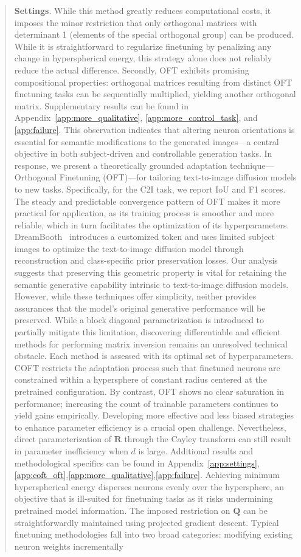 \begin{abstract}
\begin{itemize}[leftmargin=*,nosep]
\textbf{Settings}. While this method greatly reduces computational costs, it imposes the minor restriction that only orthogonal matrices with determinant 1 (elements of the special orthogonal group) can be produced. While it is straightforward to regularize finetuning by penalizing any change in hyperspherical energy, this strategy alone does not reliably reduce the actual difference. Secondly, OFT exhibits promising compositional properties: orthogonal matrices resulting from distinct OFT finetuning tasks can be sequentially multiplied, yielding another orthogonal matrix. Supplementary results can be found in Appendix~\ref{app:more_qualitative}, \ref{app:more_control_task}, and \ref{app:failure}. This observation indicates that altering neuron orientations is essential for semantic modifications to the generated images—a central objective in both subject-driven and controllable generation tasks. In response, we present a theoretically grounded adaptation technique—Orthogonal Finetuning (OFT)—for tailoring text-to-image diffusion models to new tasks. Specifically, for the C2I task, we report IoU and F1 scores. The steady and predictable convergence pattern of OFT makes it more practical for application, as its training process is smoother and more reliable, which in turn facilitates the optimization of its hyperparameters. DreamBooth~\cite{ruiz2023dreambooth} introduces a customized token and uses limited subject images to optimize the text-to-image diffusion model through reconstruction and class-specific prior preservation losses. Our analysis suggests that preserving this geometric property is vital for retaining the semantic generative capability intrinsic to text-to-image diffusion models. However, while these techniques offer simplicity, neither provides assurances that the model’s original generative performance will be preserved. While a block diagonal parametrization is introduced to partially mitigate this limitation, discovering differentiable and efficient methods for performing matrix inversion remains an unresolved technical obstacle. Each method is assessed with its optimal set of hyperparameters. COFT restricts the adaptation process such that finetuned neurons are constrained within a hypersphere of constant radius centered at the pretrained configuration. By contrast, OFT shows no clear saturation in performance; increasing the count of trainable parameters continues to yield gains empirically. Developing more effective and less biased strategies to enhance parameter efficiency is a crucial open challenge. Nevertheless, direct parameterization of $\bm{R}$ through the Cayley transform can still result in parameter inefficiency when $d$ is large. Additional results and methodological specifics can be found in Appendix~\ref{app:settings},\ref{app:coft_oft},\ref{app:more_qualitative},\ref{app:failure}. Achieving minimum hyperspherical energy disperses neurons evenly over the hypersphere, an objective that is ill-suited for finetuning tasks as it risks undermining pretrained model information. The imposed restriction on $\bm{Q}$ can be straightforwardly maintained using projected gradient descent. Typical finetuning methodologies fall into two broad categories: modifying existing neuron weights incrementally 
\end{itemize}
\end{abstract}

